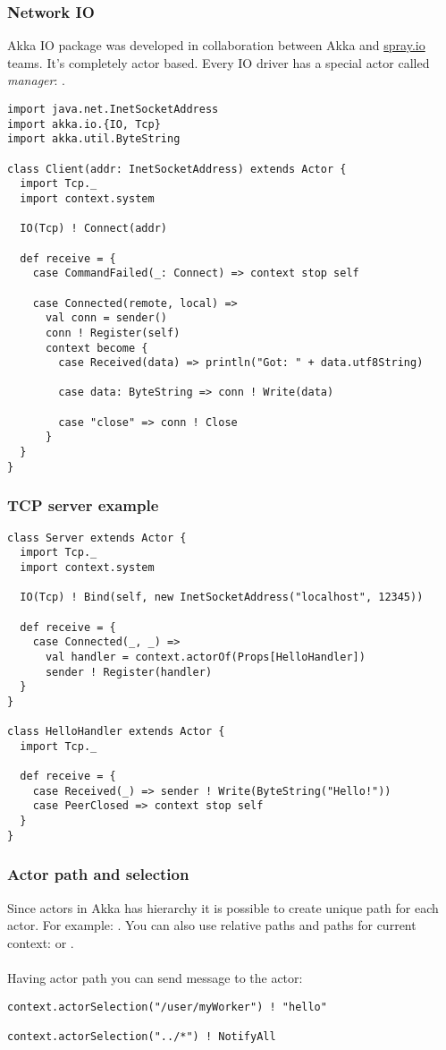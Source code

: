 \documentclass{beamer}
\begin{document}
\begin{frame}[fragile]
\frametitle{Network IO}
Akka IO package was developed in collaboration between Akka and \href{http://spray.io}{spray.io} teams. 
It's completely actor based. Every IO driver has a special actor called \emph{manager}:
.

\begin{example}
\begin{lstlisting}
import java.net.InetSocketAddress
import akka.io.{IO, Tcp}
import akka.util.ByteString

class Client(addr: InetSocketAddress) extends Actor {
  import Tcp._
  import context.system

  IO(Tcp) ! Connect(addr)

  def receive = {
    case CommandFailed(_: Connect) => context stop self

    case Connected(remote, local) =>
      val conn = sender()
      conn ! Register(self)
      context become {
        case Received(data) => println("Got: " + data.utf8String)

        case data: ByteString => conn ! Write(data)

        case "close" => conn ! Close
      }
  }
}
\end{lstlisting}
\end{example}
\end{frame}

\begin{frame}[fragile]
\frametitle{TCP server example}
\begin{lstlisting}
class Server extends Actor {
  import Tcp._
  import context.system

  IO(Tcp) ! Bind(self, new InetSocketAddress("localhost", 12345))

  def receive = {
    case Connected(_, _) =>
      val handler = context.actorOf(Props[HelloHandler])
      sender ! Register(handler)
  }
}

class HelloHandler extends Actor {
  import Tcp._

  def receive = {
    case Received(_) => sender ! Write(ByteString("Hello!"))
    case PeerClosed => context stop self
  }
}
\end{lstlisting}
\end{frame}

\begin{frame}[fragile]
\frametitle{Actor path and selection}
Since actors in Akka has hierarchy it is possible to create unique path for each actor.
For example: . You can also use relative paths
and paths for current context:  or .\\~\\

Having actor path you can send message to the actor:
\begin{lstlisting}
context.actorSelection("/user/myWorker") ! "hello"

context.actorSelection("../*") ! NotifyAll
\end{lstlisting}
\end{frame}
\end{document}
